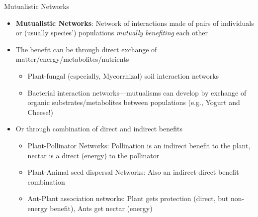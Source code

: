 \begin{frame}{Mutualistic Networks}

  \begin{itemize}[<+->]\setlength{\itemindent}{0em} \itemsep3pt
    \item {\bf Mutualistic Networks}: Network of interactions made of pairs of individuals or (usually species') populations {\it mutually benefiting} each other
    \item The benefit can be through direct exchange of matter/energy/metabolites/nutrients 
      \begin{itemize}\setlength{\itemindent}{-1em} 
        \item Plant-fungal (especially, Mycorrhizal) soil interaction networks
        \item Bacterial interaction networks---mutualisms can develop by exchange of organic substrates/metabolites between populations (e.g., Yogurt and Cheese!)
      \end{itemize} 
      \item Or through combination of direct and indirect benefits
      \begin{itemize}\setlength{\itemindent}{-1em} 
        \item Plant-Pollinator Networks: Pollination is an indirect benefit to the plant, nectar is a direct (energy) to the pollinator
        \item Plant-Animal seed dispersal Networks: Also an indirect-direct benefit combination 
        \item Ant-Plant association networks: Plant gets protection (direct, but non-energy benefit), Ants get nectar (energy) 
      \end{itemize}
  \end{itemize}

\end{frame}

